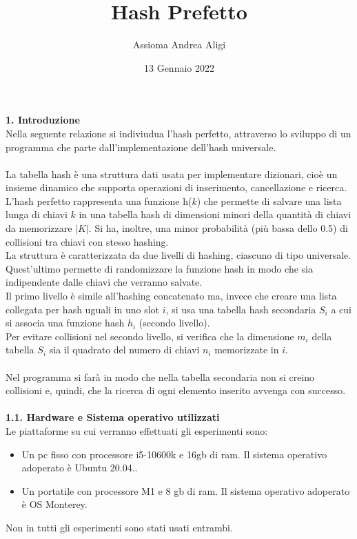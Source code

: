 \documentclass[]{article}
\begin{document}
\title{\textbf{Hash Prefetto}}
\author{Assioma Andrea Aligi}
\date{13 Gennaio 2022}
\maketitle

{\Large \textbf{1. Introduzione}}\\
Nella seguente relazione si indiviudua l'hash perfetto, attraverso lo sviluppo di un programma che parte dall'implementazione dell'hash universale.\\
\\
La tabella hash è una struttura dati usata per implementare dizionari, cioè un insieme dinamico che supporta operazioni di inserimento, cancellazione e ricerca.\\
L'hash perfetto rappresenta una funzione h($k$) che permette di salvare una lista lunga di chiavi $k$ in una tabella hash di dimensioni minori della quantità di chiavi da memorizzare $|\textit{K}|$. 
Si ha, inoltre, una minor probabilità (più bassa dello 0.5) di collisioni tra chiavi con stesso hashing.\\
La struttura è caratterizzata da due livelli di hashing, ciascuno di tipo universale. Quest'ultimo permette di randomizzare la funzione hash in modo che sia indipendente dalle chiavi che verranno salvate.\\
Il primo livello è simile all'hashing concatenato ma, invece che creare una lista collegata per hash uguali in uno slot $i$, si usa una tabella hash secondaria $S_i$ a cui si associa una funzione hash $h_i$ (secondo livello).\\
Per evitare collisioni nel secondo livello, si verifica che la dimensione $m_i$ della tabella $S_i$ sia il quadrato del numero di chiavi $n_i$ memorizzate in $i$.\\
\\
Nel programma si farà in modo che nella tabella secondaria non si creino collisioni e, quindi, che la ricerca di ogni elemento inserito avvenga con successo.\\
\\
{\large \textbf{{\Large{1}}.{\small{1}}. Hardware e Sistema operativo utilizzati}}\\
Le piattaforme su cui verranno effettuati gli esperimenti sono:
\begin{itemize}
  \item Un pc fisso con processore i5-10600k e 16gb di ram. Il sistema operativo adoperato è Ubuntu 20.04..
  \item Un portatile con processore M1 e 8 gb di ram. Il sistema operativo adoperato è OS Monterey.
\end{itemize}
Non in tutti gli esperimenti sono stati usati entrambi.
\end{document}

